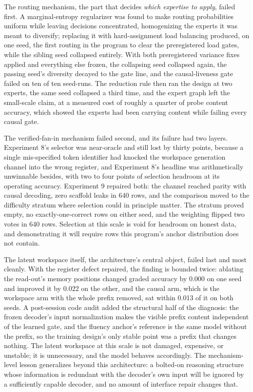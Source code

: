 \documentclass[10pt,a4paper]{article}
\begin{document}
The routing mechanism, the part that decides \emph{which expertise to apply},
failed first. A marginal-entropy regularizer was found to make routing
probabilities uniform while leaving decisions concentrated, homogenizing the
experts it was meant to diversify; replacing it with hard-assignment load
balancing produced, on one seed, the first routing in the program to clear the
preregistered load gates, while the sibling seed collapsed entirely. With
both preregistered variance fixes applied and everything else frozen, the
collapsing seed collapsed again, the passing seed's diversity decayed to the
gate line, and the causal-liveness gate failed on ten of ten seed-runs. The
reduction rule then ran the design at two experts, the same seed collapsed a
third time, and the expert graph left the small-scale claim, at a measured
cost of roughly a quarter of probe content accuracy, which showed the experts
had been carrying content while failing every causal gate.

The verified-fan-in mechanism failed second, and its failure had two layers.
Experiment 8's selector was near-oracle and still lost by thirty points, because a
single mis-specified token identifier had knocked the workspace generation
channel into the wrong register, and Experiment 8's headline was arithmetically
unwinnable besides, with two to four points of selection headroom at its
operating accuracy. Experiment 9 repaired both: the channel reached parity with
causal decoding, zero scaffold leaks in 640 rows, and the comparison moved to
the difficulty stratum where selection could in principle matter. The stratum
proved empty, no exactly-one-correct rows on either seed, and the weighting
flipped two votes in 640 rows. Selection at this scale is void for headroom
on honest data, and demonstrating it will require rows this program's anchor
distribution does not contain.

The latent workspace itself, the architecture's central object, failed last
and most cleanly. With the register defect repaired, the finding is bounded
twice: ablating the read-out's memory positions changed graded accuracy by
0.000 on one seed and improved it by 0.022 on the other, and the causal arm,
which is the workspace arm with the whole prefix removed, sat within 0.013 of
it on both seeds. A post-session code audit added the structural half of the
diagnosis: the frozen decoder's input normalization makes the visible prefix
content independent of the learned gate, and the fluency anchor's reference
is the same model without the prefix, so the training design's only stable
point was a prefix that changes nothing. The latent workspace at
this scale is not damaged, expensive, or unstable; it is unnecessary, and the
model behaves accordingly. The mechanism-level lesson generalizes beyond this
architecture: a bolted-on reasoning structure whose information is redundant
with the decoder's own input will be ignored by a sufficiently capable
decoder, and no amount of interface repair changes that.
\end{document}
